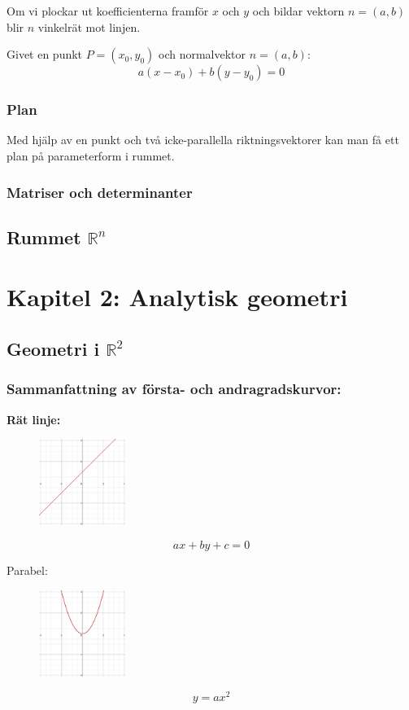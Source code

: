 \documentclass[a4paper,12pt]{article}
\begin{document}
Om vi plockar ut koefficienterna framför $x$ och $y$ och bildar vektorn $n = (a,b)$ blir $n$ vinkelrät mot linjen.  

Givet en punkt $P=(x_0,y_0)$ och normalvektor $n=(a,b)$:
\[
a(x - x_0) + b(y - y_0) = 0
\]

\subsubsection*{Plan}
Med hjälp av en punkt och två icke-parallella riktningsvektorer kan man få ett plan på parameterform i rummet.

\subsubsection*{Matriser och determinanter}

\subsection{Rummet $\mathbb{R}^n$}


\section{Kapitel 2: Analytisk geometri}

\subsection{Geometri i $\mathbb{R}^2$}
\subsubsection*{Sammanfattning av första- och andragradskurvor:}
\textbf{Rät linje:}

\begin{figure}[H]
  \centering
  \includegraphics[width=0.25\textwidth]{ratlinje.png}
  \caption{}
\end{figure}
\[
ax + by + c = 0
\]

Parabel:
\begin{figure}[H]
  \centering
  \includegraphics[width=0.25\textwidth]{parabel.png}
  \caption{}
\end{figure}
\[
y = ax^2
\]
\end{document}
